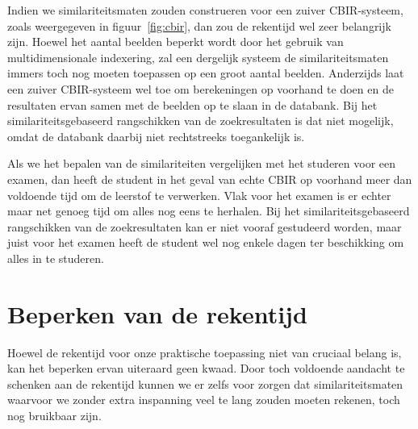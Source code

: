 Indien we similariteitsmaten zouden construeren voor een zuiver CBIR-systeem, zoals weergegeven
in figuur~\ref{fig:cbir}, dan zou de rekentijd wel zeer belangrijk zijn. Hoewel het aantal
beelden beperkt wordt door het gebruik van multidimensionale indexering, zal een dergelijk
systeem de similariteitsmaten immers toch nog moeten toepassen op een groot aantal
beelden. Anderzijds laat een zuiver CBIR-systeem wel toe om berekeningen op voorhand te doen
en de resultaten ervan samen met de beelden op te slaan in de databank. Bij het similariteitsgebaseerd
rangschikken van de zoekresultaten is dat niet mogelijk, omdat de databank daarbij niet rechtstreeks
toegankelijk is.

Als we het bepalen van de similariteiten vergelijken met het studeren voor een examen, dan 
heeft de student in het geval van echte CBIR op voorhand meer dan voldoende tijd om de leerstof
te verwerken. Vlak voor het examen is er echter maar net genoeg tijd om alles nog eens 
te herhalen. Bij het similariteitsgebaseerd rangschikken van de zoekresultaten kan er niet vooraf 
gestudeerd worden, maar juist voor het examen heeft de student wel nog enkele dagen ter beschikking 
om alles in te studeren.


\section{Beperken van de rekentijd}
\label{sectie:beperken_rekentijd}

Hoewel de rekentijd voor onze praktische toepassing niet van cruciaal belang is, kan het beperken 
ervan uiteraard geen kwaad. Door toch voldoende aandacht te schenken aan de rekentijd kunnen
we er zelfs voor zorgen dat similariteitsmaten waarvoor we zonder extra inspanning veel te lang zouden 
moeten rekenen, toch nog bruikbaar zijn.

